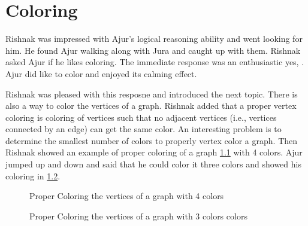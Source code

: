 \chapter{Coloring}
Rishnak  was impressed with Ajur's logical reasoning ability and went looking for him. He found Ajur walking along with Jura and caught up with them. Rishnak asked Ajur if he likes coloring. The immediate response was an enthusiastic yes, . Ajur did like to color and enjoyed its calming effect.

Rishnak was pleased with this resposne and introduced the next topic.  There is also a way to color the vertices of a graph. Rishnak added that a proper vertex coloring is coloring of vertices such that no adjacent vertices (i.e., vertices connected by an edge) can get the same color. An interesting problem is to determine the smallest number of colors to properly vertex color a graph. 
Then Rishnak showed an example of proper coloring of a graph \ref{10g1} with 4 colors. Ajur jumped up and down and said that he could color it three colors and showed his coloring in \ref{10g2}.
\begin{figure}[h]
\begin{center}
\caption{ Proper Coloring the vertices of a graph with 4 colors}\label{10g1}
\end{center}
\end{figure}

\begin{figure}[h]
\begin{center}
\caption{ Proper Coloring the vertices of a graph with 3 colors colors}\label{10g2}
\end{center}
\end{figure}

